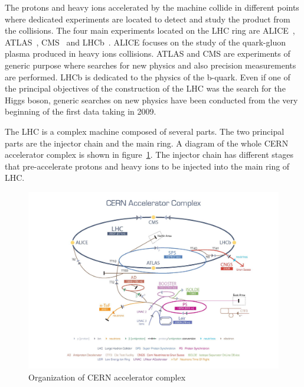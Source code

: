 The protons and heavy ions accelerated by the machine collide in different points where dedicated experiments are located to detect and study the product from the collisions. The four main experiments located on the LHC ring are ALICE~\cite{Cortese:879894}, ATLAS~\cite{ATLAS:1999}, CMS~\cite{Bayatian:922757,Bayatian:942733} and LHCb~\cite{Alves:2008zz}. ALICE focuses on the study of the quark-gluon plasma produced in heavy ions collisions. ATLAS and CMS are experiments of generic purpose where searches for new physics and also precision measurements are performed. LHCb is dedicated to the physics of the b-quark. Even if one of the principal objectives of the construction of the LHC was the search for the Higgs boson, generic searches on new physics have been conducted from the very beginning of the first data taking in 2009. %

The LHC is a complex machine composed of several parts. The two principal parts are the injector chain and the main ring. A diagram of the whole CERN accelerator complex is shown in figure~\ref{fig:Complex}. The injector chain has different stages that pre-accelerate protons and heavy ions to be injected into the main ring of LHC. %

\begin{figure}[!Hhtbp]
  \begin{center}
    \includegraphics[trim=4.5cm 0cm 0cm 0cm, clip=true, width=1.15\textwidth]{figs/cern-lhc-4.jpg}
    \caption{Organization of CERN accelerator complex}
    \label{fig:Complex}
  \end{center}
\end{figure}

